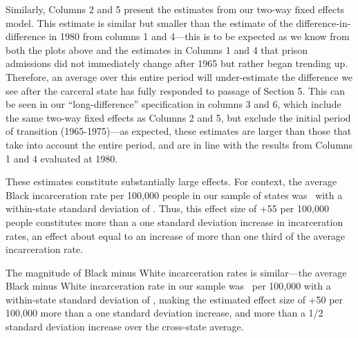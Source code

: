 \documentclass[12pt]{article}
\begin{document}
Similarly, Columns 2 and 5 present the estimates from our two-way fixed effects model. This estimate is similar but smaller than the estimate of the difference-in-difference in 1980 from columns 1 and 4---this is to be expected as we know from both the plots above and the estimates in Columns 1 and 4 that prison admissions did not immediately change after 1965 but rather began trending up.  Therefore, an average over this entire period will under-estimate the difference we see after the carceral state has fully responded to passage of Section 5.  This can be seen in our ``long-difference'' specification in columns 3 and 6, which include the same two-way fixed effects as Columns 2 and 5, but exclude the initial period of transition (1965-1975)---as expected, these estimates are larger than those that take into account the entire period, and are in line with the results from Columns 1 and 4 evaluated at 1980.

These estimates constitute substantially large effects. For context, the average Black incarceration rate per 100,000 people in our sample of states was \unskip~with a within-state standard deviation of \unskip. Thus, this effect size of +55 per 100,000 people constitutes more than a one standard deviation increase in incarceration rates, an effect about equal to an increase of more than one third of the average incarceration rate.

The magnitude of Black minus White incarceration rates is similar---the average Black minus White incarceration rate in our sample was \unskip~per 100,000 with a within-state standard deviation of \unskip, making the estimated effect size of +50 per 100,000 more than a one standard deviation increase, and more than a 1/2 standard deviation increase over the cross-state average.
\end{document}
